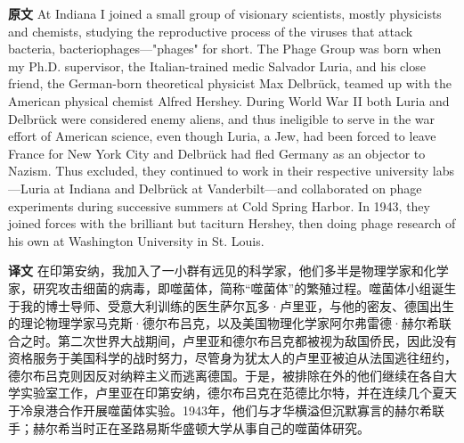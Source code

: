 \documentclass[UTF8,zihao=-4]{ctexart}
\newcommand{\BodyFont}{\fontsize{10.5pt}{15.5pt}\selectfont}
\renewenvironment{quote}{\par\noindent\begingroup\BodyFont}{\par\endgroup}
\begin{document}
\begin{quote}
\noindent\textbf{原文} At Indiana I joined a small group of visionary scientists, mostly physicists and chemists, studying the reproductive process of the viruses that attack bacteria, bacteriophages---"phages" for short. The Phage Group was born when my Ph.D. supervisor, the Italian-trained medic Salvador Luria, and his close friend, the German-born theoretical physicist Max Delbrück, teamed up with the American physical chemist Alfred Hershey. During World War II both Luria and Delbrück were considered enemy aliens, and thus ineligible to serve in the war effort of American science, even though Luria, a Jew, had been forced to leave France for New York City and Delbrück had fled Germany as an objector to Nazism. Thus excluded, they continued to work in their respective university labs---Luria at Indiana and Delbrück at Vanderbilt---and collaborated on phage experiments during successive summers at Cold Spring Harbor. In 1943, they joined forces with the brilliant but taciturn Hershey, then doing phage research of his own at Washington University in St. Louis.

\smallskip
\noindent\textbf{译文} 在印第安纳，我加入了一小群有远见的科学家，他们多半是物理学家和化学家，研究攻击细菌的病毒，即噬菌体，简称“噬菌体”的繁殖过程。噬菌体小组诞生于我的博士导师、受意大利训练的医生萨尔瓦多·卢里亚，与他的密友、德国出生的理论物理学家马克斯·德尔布吕克，以及美国物理化学家阿尔弗雷德·赫尔希联合之时。第二次世界大战期间，卢里亚和德尔布吕克都被视为敌国侨民，因此没有资格服务于美国科学的战时努力，尽管身为犹太人的卢里亚被迫从法国逃往纽约，德尔布吕克则因反对纳粹主义而逃离德国。于是，被排除在外的他们继续在各自大学实验室工作，卢里亚在印第安纳，德尔布吕克在范德比尔特，并在连续几个夏天于冷泉港合作开展噬菌体实验。1943年，他们与才华横溢但沉默寡言的赫尔希联手；赫尔希当时正在圣路易斯华盛顿大学从事自己的噬菌体研究。
\end{quote}
\end{document}
